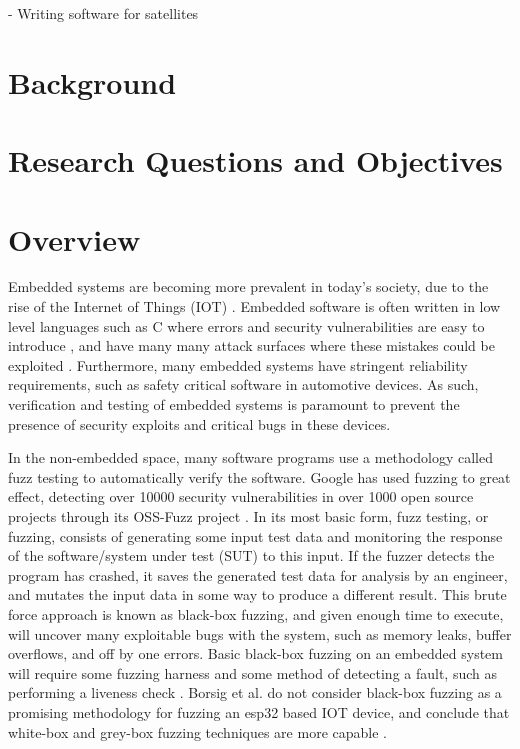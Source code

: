 \documentclass[../report.tex]{subfiles}
\begin{document}
- Writing software for satellites

\section{Background}

\section{Research Questions and Objectives}


\section{Overview}


Embedded systems are becoming more prevalent in today's society, due to the
rise of the Internet of Things (IOT) \citep{Abdumohasan_2021}. Embedded
software is often written in low level languages such as C where errors and
security vulnerabilities are easy to introduce \citep{Svoboda_2021}, and have
many many attack surfaces where these mistakes could be exploited
\citep{Abdumohasan_2021}. Furthermore, many embedded systems have stringent
reliability requirements, such as safety critical software in automotive
devices. As such, verification and testing of embedded systems is paramount to
prevent the presence of security exploits and critical bugs in these devices.

In the non-embedded space, many software programs use a methodology called fuzz
testing to automatically verify the software. Google has used fuzzing to great
effect, detecting over 10000 security vulnerabilities in over 1000 open source
projects through its OSS-Fuzz project \citep{Google_2023}. In its most basic
form, fuzz testing, or fuzzing, consists of generating some input test data and
monitoring the response of the software/system under test (SUT) to this input.
If the fuzzer detects the program has crashed, it saves the generated test data
for analysis by an engineer, and mutates the input data in some way to produce
a different result. This brute force approach is known as black-box fuzzing,
and given enough time to execute, will uncover many exploitable bugs with the
system, such as memory leaks, buffer overflows, and off by one errors. Basic
black-box fuzzing on an embedded system will require some fuzzing harness
\citep{Eisele_et_al_2022} and some method of detecting a fault, such as
performing a liveness check \citep{Yun_2022}. Borsig et al. do not consider
black-box fuzzing as a promising methodology for fuzzing an esp32 based IOT
device, and conclude that white-box and grey-box fuzzing techniques are more
capable \citep{Borsig_2020}.
\end{document}
